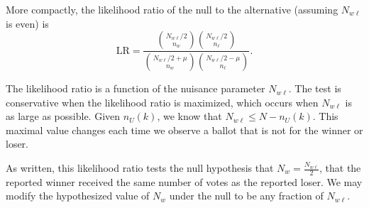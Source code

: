 \documentclass[12pt]{article}
\newcommand{\beq}{\begin{equation}}
\newcommand{\eeq}{\end{equation}}
\begin{document}
More compactly, the likelihood ratio of the null to the alternative (assuming $N_{w\ell}$ is even) is
\beq
   \mbox{LR} = \frac{ {N_{w\ell}/2 \choose n_w}{N_{w\ell}/2 \choose n_\ell}}
           {{N_{w\ell}/2+\mu \choose n_w}{N_{w\ell}/2-\mu \choose n_\ell}}.
\eeq

The likelihood ratio is a function of the nuisance parameter $N_{w\ell}$.
The test is conservative when the likelihood ratio is maximized, which occurs when $N_{w\ell}$ is as large as possible. 
Given $n_U(k)$, we know that $N_{w\ell} \leq N - n_U(k)$.
This maximal value changes each time we observe a ballot that is not for the winner or loser.

As written, this likelihood ratio tests the null hypothesis that $N_w = \frac{N_{w\ell}}{2}$, 
that the reported winner received the same number of votes as the reported loser.
We may modify the hypothesized value of $N_w$ under the null to be any fraction of $N_{w\ell}$.



\end{document}
